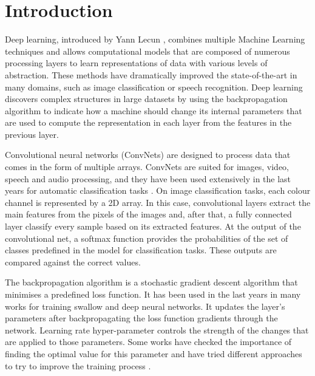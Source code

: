 \documentclass[10pt, a4paper, titlepage, twocolumn]{article}
\begin{document}
	\selectfont
		
	\section{Introduction}
	\label{sect:introduction}
	Deep learning, introduced by Yann Lecun \cite{lecun2015deep}, combines multiple Machine Learning techniques and allows computational models that are composed of numerous processing layers to learn representations of data with various levels of abstraction. These methods have dramatically improved the state-of-the-art in many domains, such as image classification or speech recognition. Deep learning discovers complex structures in large datasets by using the backpropagation algorithm to indicate how a machine should change its internal parameters that are used to compute the representation in each layer from the features in the previous layer.
	
	Convolutional neural networks (ConvNets) are designed to process data that comes in the form of multiple arrays. ConvNets are suited for images, video, speech and audio processing, and they have been used extensively in the last years for automatic classification tasks \cite{dong2014learning}\cite{sun2013deep}\cite{ronneberger2015u}. On image classification tasks, each colour channel is represented by a 2D array. In this case, convolutional layers extract the main features from the pixels of the images and, after that, a fully connected layer classify every sample based on its extracted features. At the output of the convolutional net, a softmax function provides the probabilities of the set of classes predefined in the model for classification tasks. These outputs are compared against the correct values.
	
	The backpropagation algorithm is a stochastic gradient descent algorithm that minimises a predefined loss function. It has been used in the last years in many works \cite{leonard1990improvement}\cite{yu1995dynamic}\cite{krizhevsky2012imagenet}\cite{de2018weighted} for training swallow and deep neural networks. It updates the layer's parameters after backpropagating the loss function gradients through the network. Learning rate hyper-parameter controls the strength of the changes that are applied to those parameters. Some works have checked the importance of finding the optimal value for this parameter \cite{senior2013empirical} and have tried different approaches to try to improve the training process \cite{smith2017cyclical}.
	
\end{document}
